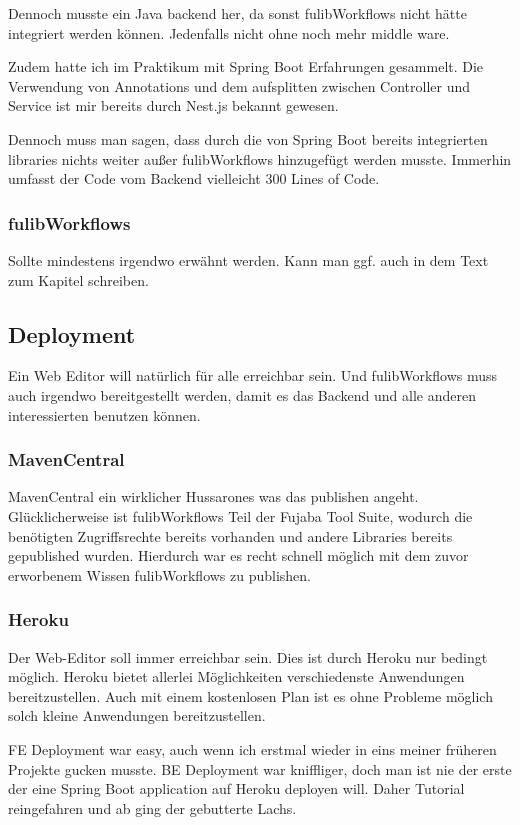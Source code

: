 Dennoch musste ein Java backend her, da sonst fulibWorkflows nicht hätte integriert werden können.
Jedenfalls nicht ohne noch mehr middle ware.

Zudem hatte ich im Praktikum mit Spring Boot Erfahrungen gesammelt.
Die Verwendung von Annotations und dem aufsplitten zwischen Controller und Service ist mir bereits
durch Nest.js bekannt gewesen.

Dennoch muss man sagen, dass durch die von Spring Boot bereits integrierten libraries nichts weiter
außer fulibWorkflows hinzugefügt werden musste.
Immerhin umfasst der Code vom Backend vielleicht 300 Lines of Code.

\subsubsection{fulibWorkflows}
\todo
Sollte mindestens irgendwo erwähnt werden.
Kann man ggf. auch in dem Text zum Kapitel schreiben.

\subsection{Deployment}\label{subsec:deployment}
\todo
Ein Web Editor will natürlich für alle erreichbar sein.
Und fulibWorkflows muss auch irgendwo bereitgestellt werden, damit es das Backend und alle anderen
interessierten benutzen können.

\subsubsection{MavenCentral}\label{subsubsec:mavencentral}
\todo
MavenCentral ein wirklicher Hussarones was das publishen angeht.
Glücklicherweise ist fulibWorkflows Teil der Fujaba Tool Suite, wodurch die benötigten
Zugriffsrechte bereits vorhanden und andere Libraries bereits gepublished wurden.
Hierdurch war es recht schnell möglich mit dem zuvor erworbenem Wissen fulibWorkflows
zu publishen.

\subsubsection{Heroku}\label{subsubsec:heroku}
\todo
Der Web-Editor soll immer erreichbar sein.
Dies ist durch Heroku nur bedingt möglich.
Heroku bietet allerlei Möglichkeiten verschiedenste Anwendungen bereitzustellen.
Auch mit einem kostenlosen Plan ist es ohne Probleme möglich solch kleine Anwendungen bereitzustellen.

FE Deployment war easy, auch wenn ich erstmal wieder in eins meiner früheren Projekte gucken musste.
BE Deployment war kniffliger, doch man ist nie der erste der eine Spring Boot application
auf Heroku deployen will.
Daher Tutorial reingefahren und ab ging der gebutterte Lachs.
